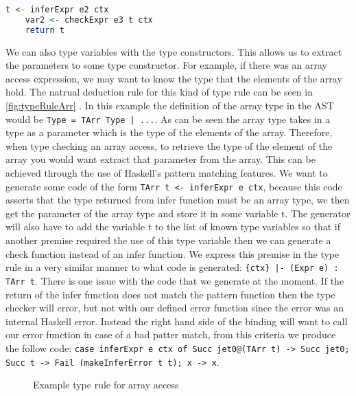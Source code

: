 \begin{lstlisting}[caption = Code generated for type variables in inferExpr from TExprIf, label=lst:codeTExprIfInfer, language=Haskell]
    t <- inferExpr e2 ctx
    var2 <- checkExpr e3 t ctx
    return t
\end{lstlisting}

We can also type variables with the type constructors.
This allows us to extract the parameters to some type constructor.
For example, if there was an array access expression, we may want to know the type that the elements of the array hold.
The natrual deduction rule for this kind of type rule can be seen in \autoref{fig:typeRuleArr} .
In this example the definition of the array type in the AST would be \texttt{Type = TArr Type | ...}.
As can be seen the array type takes in a type as a parameter which is the type of the elements of the array.
Therefore, when type checking an array access, to retrieve the type of the element of the array you would want extract that parameter from the array.
This can be achieved through the use of Haskell's pattern matching features.
We want to generate some code of the form \texttt{TArr t <- inferExpr e ctx}, because this code asserts that the type returned from infer function must be an array type, we then get the parameter of the array type and store it in some variable t.
The generator will also have to add the variable t to the list of known type variables so that if another premise required the use of this type variable then we can generate a check function instead of an infer function.
We express this premise in the type rule in a very similar manner to what code is generated:
\texttt{\{ctx\} |- (Expr e) : TArr t}.
There is one issue with the code that we generate at the moment.
If the return of the infer function does not match the pattern function then the type checker will error, but not with our defined error function since the error was an internal Haskell error.
Instead the right hand side of the binding will want to call our error function in case of a bad patter match, from this criteria we produce the follow code: \texttt{case inferExpr e ctx of Succ jet0@(TArr t) -> Succ jet0; Succ t -> Fail (makeInferError t t); x -> x}.

\begin{figure}[t]
    \centering
    \begin{prooftree}
    \end{prooftree}
    \caption{Example type rule for array access}
    \label{fig:typeRuleArr}
\end{figure}

